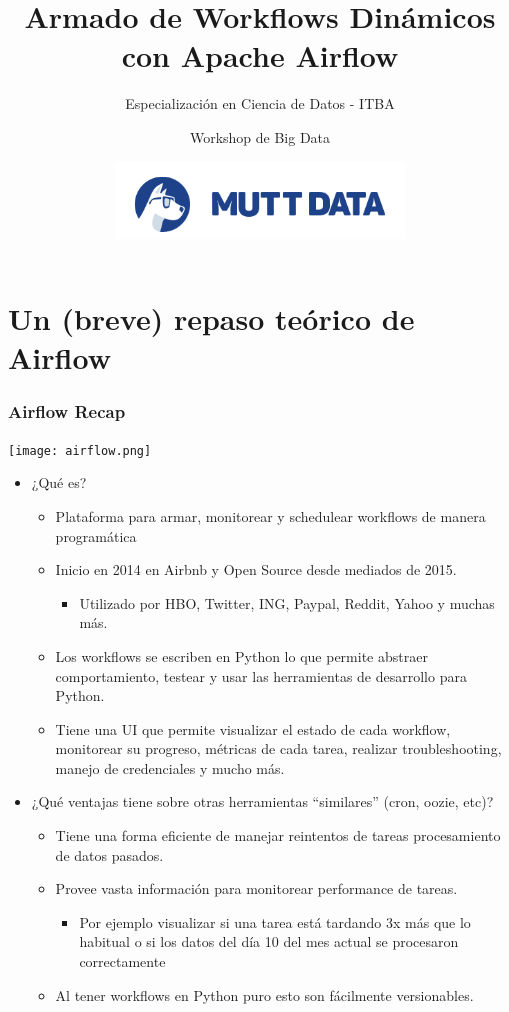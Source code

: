 \documentclass[leqno, 10pt, envcountsect]{beamer}
\title[Intro Airflow]{Armado de Workflows Dinámicos con Apache Airflow}
\subtitle{Especialización en Ciencia de Datos - ITBA}
\author[]{Workshop de Big Data}
\institute[]{17 de Diciembre de 2020}
\date[]{\includegraphics[scale=0.35]{logo_mutt.png}}
\numberwithin{equation}{section}
\theoremstyle{definition}
\theoremstyle{example}
\numberwithin{figure}{section}
\numberwithin{table}{section}
\let\olditem\item
\renewcommand{\item}{%
\olditem\vspace{1pt}}
\begin{document}
\frame[plain]{\titlepage}

\section{Un (breve) repaso teórico de Airflow}
\label{sec:un_breve_repaso_teorico_de_airflow}

\begin{frame}[fragile=singleslide]
  \frametitle{Airflow Recap}
  \begin{center}
    \texttt{[image: airflow.png]}
  \end{center}
  \begin{itemize}
    \item ¿Qué es?
    \begin{itemize}
      \item Plataforma para armar, monitorear y schedulear workflows de manera programática
      \item Inicio en 2014 en Airbnb y Open Source desde mediados de 2015.
        \begin{itemize}
          \item Utilizado por HBO, Twitter, ING, Paypal, Reddit, Yahoo y muchas más.
        \end{itemize}
      \item Los workflows se escriben en Python lo que permite abstraer
        comportamiento, testear y usar las herramientas de desarrollo para
        Python.
      \item Tiene una UI que permite visualizar el estado de cada workflow,
        monitorear su progreso, métricas de cada tarea, realizar
        troubleshooting, manejo de credenciales y mucho más.
    \end{itemize}
  \item ¿Qué ventajas tiene sobre otras herramientas \enquote{similares} (cron, oozie,
    etc)?
    \begin{itemize}
      \item Tiene una forma eficiente de manejar reintentos de tareas procesamiento de datos pasados.
      \item Provee vasta información para monitorear performance de tareas.
        \begin{itemize}
          \item Por ejemplo visualizar si una tarea está tardando 3x más que lo habitual
          o si los datos del día 10 del mes actual se procesaron correctamente
        \end{itemize}
      \item Al tener workflows en Python puro esto son fácilmente versionables.
    \end{itemize}
  \end{itemize}
\end{frame}
\end{document}
